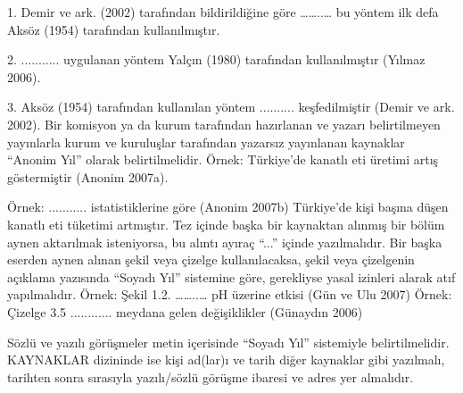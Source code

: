 1. Demir ve ark. (2002) tarafından bildirildiğine göre ……..… bu yöntem ilk defa Aksöz (1954) tarafından kullanılmıştır.

2. ........... uygulanan yöntem Yalçın (1980) tarafından kullanılmıştır (Yılmaz 2006).

3. Aksöz (1954) tarafından kullanılan yöntem .......... keşfedilmiştir (Demir ve ark. 2002).
Bir komisyon ya da kurum tarafından hazırlanan ve yazarı belirtilmeyen yayınlarla kurum ve kuruluşlar tarafından yazarsız yayınlanan kaynaklar “Anonim Yıl” olarak belirtilmelidir. Örnek: Türkiye’de kanatlı eti üretimi artış göstermiştir (Anonim 2007a).

Örnek: ........... istatistiklerine göre (Anonim 2007b) Türkiye’de kişi başına düşen kanatlı eti tüketimi artmıştır.
Tez içinde başka bir kaynaktan alınmış bir bölüm aynen aktarılmak isteniyorsa, bu alıntı ayıraç “...” içinde yazılmalıdır.
Bir başka eserden aynen alınan şekil veya çizelge kullanılacaksa, şekil veya çizelgenin açıklama yazısında “Soyadı Yıl” sistemine göre, gerekliyse yasal izinleri alarak atıf yapılmalıdır. Örnek: Şekil 1.2. ……..… pH üzerine etkisi (Gün ve Ulu 2007)
Örnek: Çizelge 3.5 ............ meydana gelen değişiklikler (Günaydın 2006)

Sözlü ve yazılı görüşmeler metin içerisinde “Soyadı Yıl” sistemiyle belirtilmelidir. KAYNAKLAR dizininde ise kişi ad(lar)ı ve tarih diğer kaynaklar gibi yazılmalı, tarihten sonra sırasıyla yazılı/sözlü görüşme ibaresi ve adres yer almalıdır.





